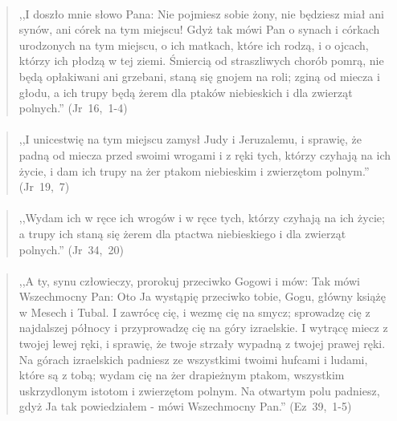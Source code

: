 \documentclass[10pt,a4paper,oneside]{article}
\begin{document}
\paragraph{}
\begin{quote}
,,I doszło mnie słowo Pana: Nie pojmiesz sobie żony, nie będziesz miał ani synów, ani córek na tym miejscu! Gdyż tak mówi Pan o synach i córkach urodzonych na tym miejscu, o ich matkach, które ich rodzą, i o ojcach, którzy ich płodzą w tej ziemi. Śmiercią od straszliwych chorób pomrą, nie będą opłakiwani ani grzebani, staną się gnojem na roli; zginą od miecza i głodu, a ich trupy będą żerem dla ptaków niebieskich i dla zwierząt polnych.'' \mbox{(Jr 16, 1-4)}
\end{quote}
\paragraph{}
\begin{quote}
,,I unicestwię na tym miejscu zamysł Judy i Jeruzalemu, i sprawię, że padną od miecza przed swoimi wrogami i z ręki tych, którzy czyhają na ich życie, i dam ich trupy na żer ptakom niebieskim i zwierzętom polnym.'' \mbox{(Jr 19, 7)}
\end{quote}
\paragraph{}
\begin{quote}
,,Wydam ich w ręce ich wrogów i w ręce tych, którzy czyhają na ich życie; a trupy ich staną się żerem dla ptactwa niebieskiego i dla zwierząt polnych.'' \mbox{(Jr 34, 20)}
\end{quote}
\paragraph{}
\begin{quote}
,,A ty, synu człowieczy, prorokuj przeciwko Gogowi i mów: Tak mówi Wszechmocny Pan: Oto Ja wystąpię przeciwko tobie, Gogu, główny książę w Mesech i Tubal. I zawrócę cię, i wezmę cię na smycz; sprowadzę cię z najdalszej północy i przyprowadzę cię na góry izraelskie. I wytrącę miecz z twojej lewej ręki, i sprawię, że twoje strzały wypadną z twojej prawej ręki. Na górach izraelskich padniesz ze wszystkimi twoimi hufcami i ludami, które są z tobą; wydam cię na żer drapieżnym ptakom, wszystkim uskrzydlonym istotom i zwierzętom polnym. Na otwartym polu padniesz, gdyż Ja tak powiedziałem - mówi Wszechmocny Pan.'' \mbox{(Ez 39, 1-5)}
\end{quote}
\end{document}
